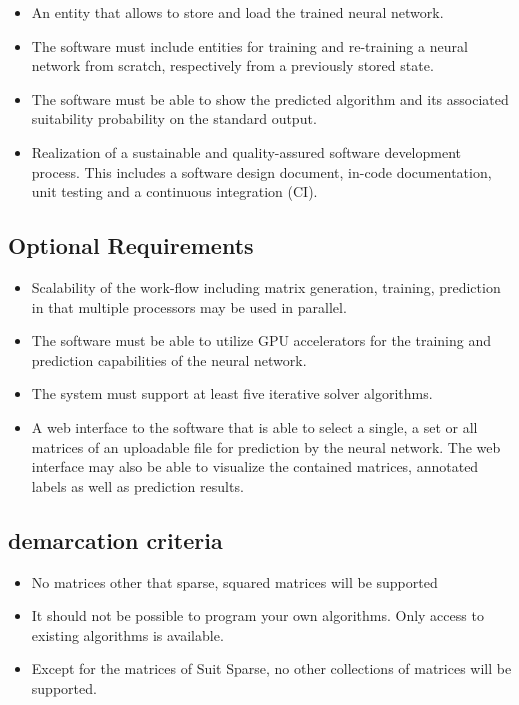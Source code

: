 \documentclass[parskip=full]{scrartcl}
\begin{document}
\begin{itemize}
\item An entity that allows to store and load the trained \gls{neural network}.

\item The software must include entities for training and re-training a \gls{neural network} from scratch, respectively from a previously stored state.

\item The software must be able to show the predicted \gls{algorithm} and its associated suitability probability on the standard output.

\item Realization of a sustainable and quality-assured software development process. This includes a software design document, in-code documentation, unit testing and a continuous integration (CI).

\end{itemize}

\subsection{Optional Requirements}

\begin{itemize}
    
\item Scalability of the work-flow including matrix generation, training, prediction in that multiple processors may be used in parallel.

\item The software must be able to utilize \gls{GPU} accelerators for the training and prediction capabilities of the \gls{neural network}.

\item The system must support at least five \gls{iterative solver} \glspl{algorithm}.

\item A web interface to the software that is able to select a single, a set or all matrices of an uploadable file for prediction by the \gls{neural network}. The web interface may also be able to visualize the contained matrices, annotated labels as well as prediction results.

\end{itemize}

\subsection{demarcation criteria}
\begin{itemize}
\item No matrices other that sparse, squared matrices will be supported

\item It should not be possible to program your own algorithms. Only access to existing algorithms is available.

\item Except for the matrices of Suit Sparse, no other collections of matrices will be supported.

\end{itemize}
\end{document}
